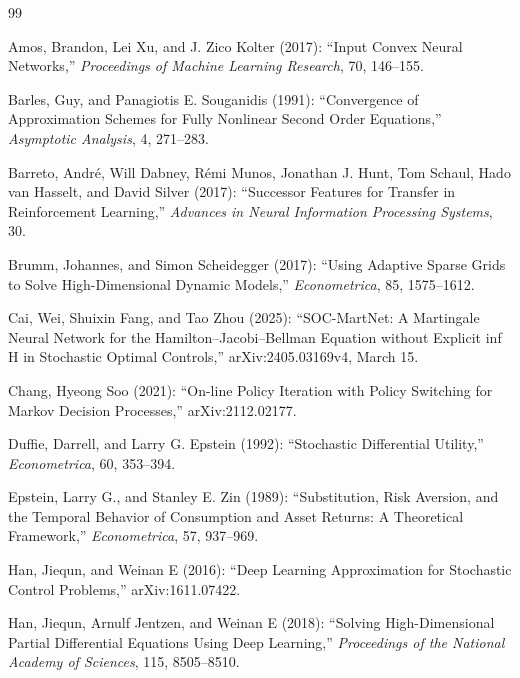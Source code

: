 \begin{thebibliography}{99}

Amos, Brandon, Lei Xu, and J. Zico Kolter (2017): ``Input Convex Neural Networks,'' \emph{Proceedings of Machine Learning Research}, 70, 146--155.

Barles, Guy, and Panagiotis E. Souganidis (1991): ``Convergence of Approximation Schemes for Fully Nonlinear Second Order Equations,'' \emph{Asymptotic Analysis}, 4, 271--283.

Barreto, Andr\'e, Will Dabney, R\'emi Munos, Jonathan J. Hunt, Tom Schaul, Hado van Hasselt, and David Silver (2017): ``Successor Features for Transfer in Reinforcement Learning,'' \emph{Advances in Neural Information Processing Systems}, 30.

Brumm, Johannes, and Simon Scheidegger (2017): ``Using Adaptive Sparse Grids to Solve High-Dimensional Dynamic Models,'' \emph{Econometrica}, 85, 1575--1612.

Cai, Wei, Shuixin Fang, and Tao Zhou (2025): ``SOC-MartNet: A Martingale Neural Network for the Hamilton--Jacobi--Bellman Equation without Explicit inf H in Stochastic Optimal Controls,'' arXiv:2405.03169v4, March 15.

Chang, Hyeong Soo (2021): ``On-line Policy Iteration with Policy Switching for Markov Decision Processes,'' arXiv:2112.02177.

Duffie, Darrell, and Larry G. Epstein (1992): ``Stochastic Differential Utility,'' \emph{Econometrica}, 60, 353--394.

Epstein, Larry G., and Stanley E. Zin (1989): ``Substitution, Risk Aversion, and the Temporal Behavior of Consumption and Asset Returns: A Theoretical Framework,'' \emph{Econometrica}, 57, 937--969.

Han, Jiequn, and Weinan E (2016): ``Deep Learning Approximation for Stochastic Control Problems,'' arXiv:1611.07422.

Han, Jiequn, Arnulf Jentzen, and Weinan E (2018): ``Solving High-Dimensional Partial Differential Equations Using Deep Learning,'' \emph{Proceedings of the National Academy of Sciences}, 115, 8505--8510.


\end{thebibliography}
